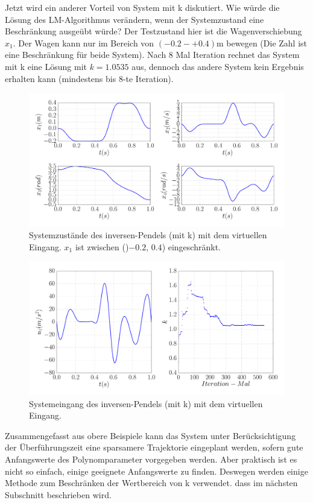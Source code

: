 \begin{beispiel}
	Jetzt wird ein anderer Vorteil von System mit k diskutiert. Wie würde die Lösung des LM-Algorithmus verändern, wenn der Systemzustand eine Beschränkung ausgeübt würde? Der Testzustand hier ist die Wagenverschiebung $x_{1}$. Der Wagen kann nur im Bereich von $(-0.2-+0.4)$m bewegen (Die Zahl ist eine Beschränkung für beide System). Nach 8 Mal Iteration rechnet das System mit k eine Lösung mit $k=1.0535$ aus, dennoch das andere System kein Ergebnis erhalten kann (mindestens bis 8-te Iteration).
	
	\begin{figure}
		\centering
		\includegraphics[width=15.5cm]{bild/30_32/example0_mit_k_x_con.pdf}
		\caption{Systemzustände des inversen-Pendels (mit k) mit dem virtuellen Eingang. $x_{1}$ ist zwischen ()$-0.2$, $0.4$) eingeschränkt.}
		\label{fig:Inverses_Pendel_mit_k_x_con}
	\end{figure}
	
	\begin{figure}
		\centering
		\includegraphics[width=12cm]{bild/30_32/example0_mit_k_u_con.pdf}
		\caption{Systemeingang des inversen-Pendels (mit k) mit dem virtuellen Eingang.}
		\label{fig:Inverses_Pendel_mit_k_u_con}
	\end{figure}

\end{beispiel}
\newpage
Zusammengefasst aus obere Beispiele kann das System unter Berücksichtigung der Überführungszeit eine sparsamere Trajektorie eingeplant werden, sofern gute Anfangswerte des Polynomparameter vorgegeben werden. Aber praktisch ist es nicht so einfach, einige geeignete Anfangswerte zu finden. Deswegen werden einige Methode zum Beschränken der Wertbereich von k verwendet. dass im nächsten Subschnitt beschrieben wird. %

